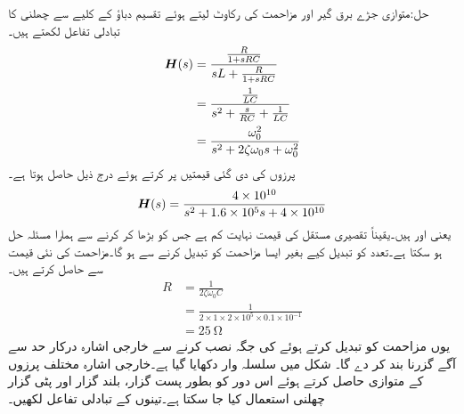 حل:متوازی جڑے برق گیر اور مزاحمت کی رکاوٹ  لیتے ہوئے تقسیم دباؤ کے کلیے سے چھلنی کا تبادلی تفاعل لکھتے ہیں۔
\begin{align*}
{\ensuremath{{\boldsymbol{H}}}}(s)&=\frac{\frac{R}{1+sRC}}{sL+\frac{R}{1+sRC}}\\
&=\frac{\frac{1}{LC}}{s^2+\frac{s}{RC}+\frac{1}{LC}}\\
&=\frac{\omega_0^2}{s^2+2\zeta \omega_0 s +\omega_0^2}
\end{align*}
پرزوں کی دی گئی قیمتیں پر کرتے ہوئے درج ذیل حاصل ہوتا ہے۔
\begin{align*}
{\ensuremath{{\boldsymbol{H}}}}(s)=\frac{4\times 10^{10}}{s^2+1.6\times 10^5 s+4\times 10^{10}}
\end{align*}
یعنی  اور  ہیں۔یقیناً تقصیری مستقل کی قیمت نہایت کم ہے جس کو بڑھا کر  کرنے سے ہمارا مسئلہ حل ہو سکتا ہے۔تعدد کو تبدیل کیے بغیر ایسا مزاحمت کو تبدیل کرنے سے ہو گا۔مزاحمت کی نئی
 قیمت  سے حاصل کرتے ہیں۔
\begin{align*}
R&=\frac{1}{2\zeta \omega_0 C}\\
&=\frac{1}{2\times 1 \times 2\times 10^5\times 0.1\times 10^{-1}}\\
&=\SI{25}{\ohm}
\end{align*}
یوں مزاحمت کو تبدیل کرتے ہوئے  کی جگہ  نصب کرنے سے خارجی اشارہ درکار حد سے آگے گزرنا بند کر دے گا۔
شکل میں سلسلہ وار  دکھایا گیا ہے۔خارجی اشارہ مختلف پرزوں کے متوازی حاصل کرتے ہوئے اس دور کو بطور پست گزار، بلند گزار اور پٹی گزار چھلنی استعمال کیا جا سکتا ہے۔تینوں  کے تبادلی تفاعل  لکھیں۔
